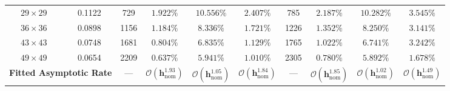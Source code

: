 \documentclass[VANCOUVER,Times1COL]{WileyNJD-v5}
\begin{document}
\begin{table}[!t]
{\begin{tabular}{cc|cccc|cccc}
            $29 \times 29$                                       & 0.1122                                       & 729                                                  & $1.922\%$                                                           & $10.556\%$                                          & $2.407\%$          & 785                                                 & $2.187\%$                                           & $10.282\%$                                          & $3.545\%$          \\
            $36 \times 36$                                       & 0.0898                                       & 1156                                                 & $1.184\%$                                                           & $8.336\%$                                           & $1.721\%$          & 1226                                                & $1.352\%$                                           & $8.250\%$                                           & $3.141\%$          \\
            $43 \times 43$                                       & 0.0748                                       & 1681                                                 & $0.804\%$                                                           & $6.835\%$                                           & $1.129\%$          & 1765                                                & $1.022\%$                                           & $6.741\%$                                           & $3.242\%$          \\
            $49 \times 49$                                       & 0.0654                                       & 2209                                                 & $0.637\%$                                                           & $5.941\%$                                           & $1.010\%$          & 2305                                                & $0.780\%$                                           & $5.892\%$                                           & $1.678\%$          \\
            \midrule
            \multicolumn{2}{c|}{\textbf{Fitted Asymptotic Rate}} & ---                                          & $\boldsymbol{\mathcal{O}(h_{\mathrm{nom}}^{1.93})}$  & $\boldsymbol{\mathcal{O}(h_{\mathrm{nom}}^{1.05})}$                 & $\boldsymbol{\mathcal{O}(h_{\mathrm{nom}}^{1.84})}$ & ---                & $\boldsymbol{\mathcal{O}(h_{\mathrm{nom}}^{1.85})}$ & $\boldsymbol{\mathcal{O}(h_{\mathrm{nom}}^{1.02})}$ & $\boldsymbol{\mathcal{O}(h_{\mathrm{nom}}^{1.49})}$                      \\

\end{tabular}}
\end{table}
\end{document}
